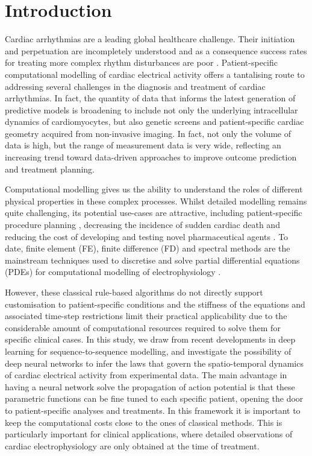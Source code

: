 \documentclass[utf8]{frontiersSCNS} %
\begin{document}
\section{Introduction}
\label{sec:intro}
Cardiac arrhythmias are a leading global healthcare challenge. Their initiation and perpetuation are incompletely understood and as a consequence success rates for treating more complex rhythm disturbances are poor \cite[]{Verma2015ApproachesFibrillation}.
Patient-specific computational modelling of cardiac electrical activity offers a tantalising route to addressing several challenges in the diagnosis and treatment of cardiac arrhythmias.
In fact, the quantity of data that informs the latest generation of predictive models \cite[]{niederer2019computational} is broadening to include not only the underlying intracellular dynamics of cardiomyocytes, but also genetic screens and patient-specific cardiac geometry acquired from non-invasive imaging. In fact, not only the volume of data is high, but the range of measurement data is very wide, reflecting an increasing trend toward data-driven approaches to improve outcome prediction and treatment planning.

Computational modelling gives us the ability to understand the roles of different physical properties in these complex processes. Whilst detailed modelling remains quite challenging, its potential use-cases are attractive, including patient-specific procedure planning \cite[]{prakosa2018personalized}, decreasing the incidence of sudden cardiac death \cite[]{arevalo2016arrhythmia} and reducing the cost of developing and testing novel pharmaceutical agents \cite[]{Mayourian2018AnArrhythmogenicity}.
To date, finite element (FE), finite difference (FD) and spectral methods are the mainstream techniques used to discretise and solve partial differential equations (PDEs) for computational modelling of electrophysiology \cite[]{clayton2011models, Cantwell2014High-orderElectrophysiology}.

However, these classical rule-based algorithms do not directly support customisation to patient-specific conditions and the stiffness of the equations and associated time-step restrictions limit their practical applicability due to the considerable amount of computational resources required to solve them for specific clinical cases.
In this study, we draw from recent developments in deep learning for sequence-to-sequence modelling, and investigate the possibility of deep neural networks to infer the laws that govern the spatio-temporal dynamics of cardiac electrical activity from experimental data.
The main advantage in having a neural network solve the propagation of action potential is that these parametric functions can be fine tuned to each specific patient, opening the door to patient-specific analyses and treatments. In this framework it is important to keep the computational costs close to the ones of classical methods. This is particularly important for clinical applications, where detailed observations of cardiac electrophysiology are only obtained at the time of treatment.
\end{document}
